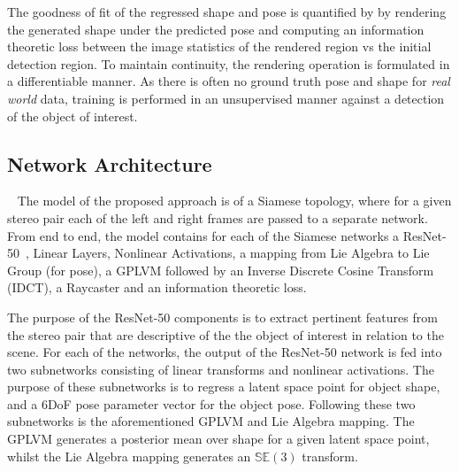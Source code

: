 The goodness of fit of the regressed shape and pose is quantified by by rendering the generated shape 
under the predicted pose and computing an information theoretic loss between the image statistics of 
the rendered region vs the initial detection region. To maintain continuity, the rendering operation is 
formulated in a differentiable manner. As there is often no ground truth pose and shape for \textit{real world} 
data, training is performed in an unsupervised manner against a detection of the object of interest.

\subsection{Network Architecture}
~\label{subsec:spp_network_architecture}
The model of the proposed approach is of a Siamese topology, where for a given stereo 
pair each of the left and right frames are passed to a separate network. From end to 
end, the model contains for each of the Siamese networks a ResNet-50~\cite{He2015}, 
Linear Layers, Nonlinear Activations, a mapping from Lie Algebra to Lie Group (for pose),
a GPLVM followed by an Inverse Discrete Cosine Transform (IDCT), a Raycaster and an information 
theoretic loss. 

The purpose of the ResNet-50 components is to extract pertinent features from the stereo 
pair that are descriptive of the the object of interest in relation to the scene. For each 
of the networks, the output of the ResNet-50 network is fed into two subnetworks consisting 
of linear transforms and nonlinear activations. The purpose of these subnetworks is to regress 
a latent space point for object shape, and a 6DoF pose parameter vector for the object pose. 
Following these two subnetworks is the aforementioned GPLVM and Lie Algebra mapping. The 
GPLVM generates a posterior mean over shape for a given latent space point, whilst the 
Lie Algebra mapping generates an \( \mathbb{SE}(3) \) transform. 

